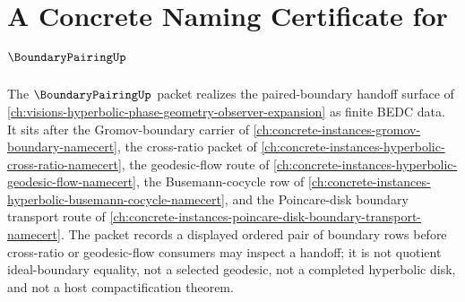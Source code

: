 \chapter{A Concrete Naming Certificate for $\BoundaryPairingUp$}
\label{ch:concrete-instances-boundary-pairing-namecert}

The $\BoundaryPairingUp$ packet realizes the paired-boundary handoff surface of \autoref{ch:visions-hyperbolic-phase-geometry-observer-expansion} as finite BEDC data. It sits after the Gromov-boundary carrier of \autoref{ch:concrete-instances-gromov-boundary-namecert}, the cross-ratio packet of \autoref{ch:concrete-instances-hyperbolic-cross-ratio-namecert}, the geodesic-flow route of \autoref{ch:concrete-instances-hyperbolic-geodesic-flow-namecert}, the Busemann-cocycle row of \autoref{ch:concrete-instances-hyperbolic-busemann-cocycle-namecert}, and the Poincare-disk boundary transport route of \autoref{ch:concrete-instances-poincare-disk-boundary-transport-namecert}. The packet records a displayed ordered pair of boundary rows before cross-ratio or geodesic-flow consumers may inspect a handoff; it is not quotient ideal-boundary equality, not a selected geodesic, not a completed hyperbolic disk, and not a host compactification theorem.

